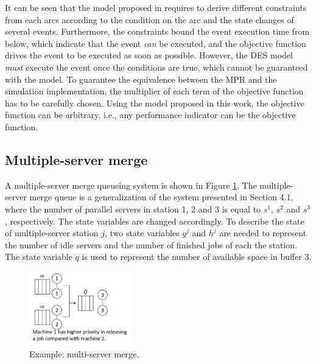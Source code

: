 \documentclass[]{interact}
\theoremstyle{plain}%
\theoremstyle{definition}
\theoremstyle{remark}
\begin{document}
It can be seen that the model proposed in \cite{chan2008optimization} requires to derive different constraints from each arcs according to the condition on the arc and the state changes of several events. Furthermore, the constraints bound the event execution time from below, which indicate that the event \textit{can} be executed, and the objective function drives the event to be executed as soon as possible. However, the DES model \textit{must} execute the event once the conditions are true, which cannot be guaranteed with the model. To guarantee the equivalence between the MPR  and the simulation implementation, the multiplier of each term of the objective function has to be carefully chosen. Using the model proposed in this work, the objective function can be arbitrary, i.e., any performance indicator can be the objective function.

\subsection{Multiple-server merge}
A multiple-server merge queueing system is shown in Figure \ref{fig:multimerge}. The multiple-server merge queue is a generalization of the system presented in Section 4.1, where the number of parallel servers in station 1, 2 and 3 is equal to $s^1$, $s^2$ and $s^3$, respectively. The state variables are changed accordingly. To describe the state of multiple-server station $j$, two state variables $g^{j}$ and $h^{j}$ are needed to represent the number of idle servers and the number of finished jobs of each the station. The state variable $q$ is used to represent the number of available space in buffer 3. 

\begin{figure}[h]
	\centering
	\includegraphics[width=0.4\textwidth]{Figures/multimerge.png}
	\caption{Example: multi-server merge.}
	\label{fig:multimerge}
\end{figure}
\end{document}
